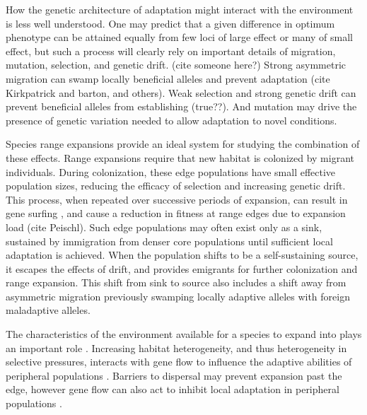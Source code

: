 How the genetic architecture of adaptation might interact with the environment is less well understood. One may predict that a given difference in optimum phenotype can be attained equally from few loci of large effect or many of small effect, but such a process will clearly rely on important details of migration, mutation, selection, and genetic drift. (cite someone here?) Strong asymmetric migration can swamp locally beneficial alleles and prevent adaptation (cite Kirkpatrick and barton, and others). Weak selection and strong genetic drift can prevent beneficial alleles from establishing (true??). And mutation may drive the presence of genetic variation needed to allow adaptation to novel conditions.

Species range expansions provide an ideal system for studying the combination of these effects. Range expansions require that new habitat is colonized by migrant individuals. During colonization, these edge populations have small effective population sizes, reducing the efficacy of selection and increasing genetic drift. This process, when repeated over successive periods of expansion, can result in gene surfing \citep{Klopfstein:2006}, and cause a reduction in fitness at range edges due to expansion load (cite Peischl). Such edge populations may often exist only as a sink, sustained by immigration from denser core populations until sufficient local adaptation is achieved. When the population shifts to be a self-sustaining source, it escapes the effects of drift, and provides emigrants for further colonization and range expansion. This shift from sink to source also includes a shift away from asymmetric migration previously swamping locally adaptive alleles with foreign maladaptive alleles.

The characteristics of the environment available for a species to expand into plays an important role \citep{Aguilee:2012, Barton:2001, Pease:1989}. Increasing habitat heterogeneity, and thus heterogeneity in selective pressures, interacts with gene flow to influence the adaptive abilities of peripheral populations \citep{Ronce:2001}. Barriers to dispersal may prevent expansion past the edge, however gene flow can also act to inhibit local adaptation in peripheral populations \citep{Slatkin:1987,Kirkpatrick:1997}. 

